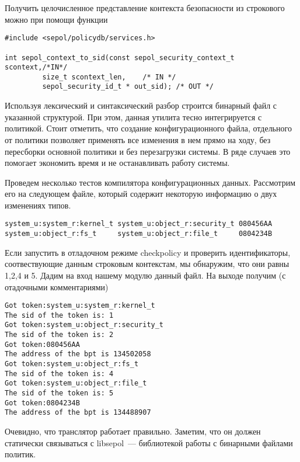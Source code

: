 Получить целочисленное представление контекста 
безопасности из строкового можно при помощи 
функции 
\begin{lstlisting}
#include <sepol/policydb/services.h>

int sepol_context_to_sid(const sepol_security_context_t scontext,/*IN*/
		 size_t scontext_len,    /* IN */
		 sepol_security_id_t * out_sid); /* OUT */
\end{lstlisting}

\bigskip

Используя лексический и синтаксический разбор 
строится бинарный файл с указанной структурой. 
При этом, данная утилита тесно интегрируется 
с политикой. Стоит отметить, что создание 
конфигурационного файла, отдельного от политики
позволяет применять все изменения в нем прямо 
на ходу, без пересборки основной политики и без
перезагрузки системы. В ряде случаев это помогает 
экономить время и не останавливать работу системы.

\bigskip
Проведем несколько тестов компилятора конфигурационных
данных. Рассмотрим его на следующем файле, который 
содержит некоторую информацию о двух изменениях 
типов. 

\bigskip
\begin{lstlisting}
system_u:system_r:kernel_t system_u:object_r:security_t 080456AA
system_u:object_r:fs_t     system_u:object_r:file_t     0804234B
\end{lstlisting}

\bigskip
Если запустить в отладочном режиме 
checkpolicy и проверить идентификаторы,
соотвествующие данным строковым контекстам, 
мы обнаружим, что они равны 1,2,4 и 5. Дадим 
на вход нашему модулю данный файл. На выходе 
получим (с отадочными комментариями)

\begin{lstlisting}
Got token:system_u:system_r:kernel_t
The sid of the token is: 1
Got token:system_u:object_r:security_t
The sid of the token is: 2
Got token:080456AA
The address of the bpt is 134502058
Got token:system_u:object_r:fs_t
The sid of the token is: 4
Got token:system_u:object_r:file_t
The sid of the token is: 5
Got token:0804234B
The address of the bpt is 134488907
\end{lstlisting}

\bigskip
Очевидно, что транслятор работает 
правильно. Заметим, что он должен статически
связываться с libsepol~--- библиотекой 
работы с бинарными файлами политик. 

